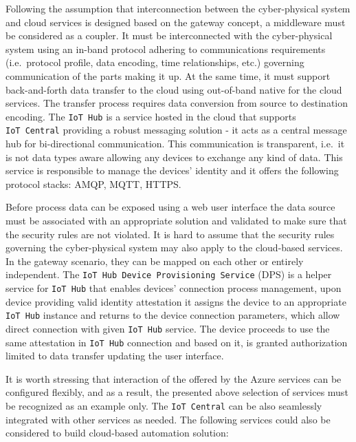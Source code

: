 \documentclass{jacsart}
\begin{document}
Following the assumption that interconnection between the cyber-physical
system and cloud services is designed based on the gateway concept, a
middleware must be considered as a coupler. It must be interconnected
with the cyber-physical system using an in-band protocol adhering to
communications requirements (i.e.~protocol profile, data encoding, time
relationships, etc.) governing communication of the parts making it up.
At the same time, it must support back-and-forth data transfer to the
cloud using out-of-band native for the cloud services. The transfer
process requires data conversion from source to destination encoding.
The \texttt{IoT\ Hub} is a service hosted in the cloud that supports
\texttt{IoT\ Central} providing a robust messaging solution - it acts as
a central message hub for bi-directional communication. This
communication is transparent, i.e.~it is not data types aware allowing
any devices to exchange any kind of data. This service is responsible to
manage the devices' identity and it offers the following protocol
stacks: AMQP, MQTT, HTTPS.

Before process data can be exposed using a web user interface the data
source must be associated with an appropriate solution and validated to
make sure that the security rules are not violated. It is hard to assume
that the security rules governing the cyber-physical system may also
apply to the cloud-based services. In the gateway scenario, they can be
mapped on each other or entirely independent. The
\texttt{IoT\ Hub\ Device\ Provisioning\ Service} (DPS) is a helper
service for \texttt{IoT\ Hub} that enables devices' connection process
management, upon device providing valid identity attestation it assigns
the device to an appropriate \texttt{IoT\ Hub} instance and returns to
the device connection parameters, which allow direct connection with
given \texttt{IoT\ Hub} service. The device proceeds to use the same
attestation in \texttt{IoT\ Hub} connection and based on it, is granted
authorization %
limited to data transfer updating the user interface.

It is worth stressing that interaction of the offered by the Azure
services can be configured flexibly, and as a result, the presented
above selection of services must be recognized as an example only. The
\texttt{IoT\ Central} can be also seamlessly integrated with other
services as needed. The following services could also be considered to
build cloud-based automation solution:
\end{document}
